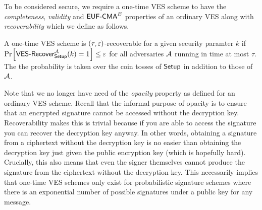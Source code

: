 To be considered secure, we require a one-time VES scheme to have the \emph{completeness}, \emph{validity} and $\textsf{EUF-CMA}^E$ properties of an ordinary VES along with \emph{recoverability} which we define as follows.

\begin{definition}[Recoverability]

  A one-time VES scheme is $(\tau,\varepsilon)$-recoverable for a given security paramter $k$ if $\prob{\textsf{VES-Recover}^{\adv}_{\Setup}(k) = 1} \leq \e$ for all adversaries $\mathcal{A}$ running in time at most $\tau$.
  The the probability is taken over the coin tosses of $\textsf{Setup}$ in addition to those of $\mathcal{A}$.

\begin{center}

 \end{center}

\end{definition}

Note that we no longer have need of the \emph{opacity} property as defined for an ordinary VES scheme. Recall that the informal purpose of opacity is to ensure that an encrypted signature cannot be accessed without the decryption key. Recoverability makes this is trivial because if you are able to access the signature you can recover the decryption key anyway. In other words, obtaining a signature from a ciphertext without the decryption key is no easier than obtaining the decryption key just given the public encryption key (which is hopefully hard). Crucially, this also means that even the signer themselves cannot produce the signature from the ciphertext without the decryption key. This necessarily implies that one-time VES schemes only exist for probabilistic signature schemes where there is an exponential number of possible signatures under a public key for any message.
